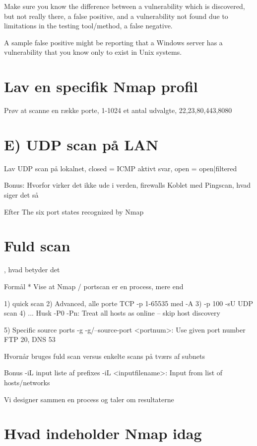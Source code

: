 \documentclass[a4paper,11pt,notitlepage]{report}
\begin{document}
Make sure you know the difference between a vulnerability which is discovered, but not really there, a false positive, and a vulnerability not found due to limitations in the testing tool/method, a false negative.

A sample false positive might be reporting that a Windows server has a vulnerability that you know only to exist in Unix systems.


\chapter{Lav en specifik Nmap profil}

Prøv at scanne en række porte, 1-1024     et antal udvalgte, 22,23,80,443,8080



\chapter{E) UDP scan på LAN}

Lav UDP scan på lokalnet, closed = ICMP aktivt svar, open = open|filtered

Bonus:
Hvorfor virker det ikke ude i verden, firewalls
Koblet med Pingscan, hvad siger det så

Efter
The six port states recognized by Nmap

\chapter{Fuld scan}
, hvad betyder det

Formål
* Vise at Nmap / portscan er en process, mere end

1) quick scan
2) Advanced, alle porte TCP -p 1-65535 med -A
3) -p 100 -sU UDP scan
4) ...
Husk
-P0
-Pn: Treat all hosts as online -- skip host discovery


5) Specific source ports -g -g/--source-port <portnum>: Use given port number FTP 20, DNS 53

Hvornår bruges fuld scan versus enkelte scans på tværs af subnets

Bonus
-iL input liste af prefixes
 -iL <inputfilename>: Input from list of hosts/networks

Vi designer sammen en process og taler om resultaterne

\chapter{Hvad indeholder Nmap idag}
\end{document}
